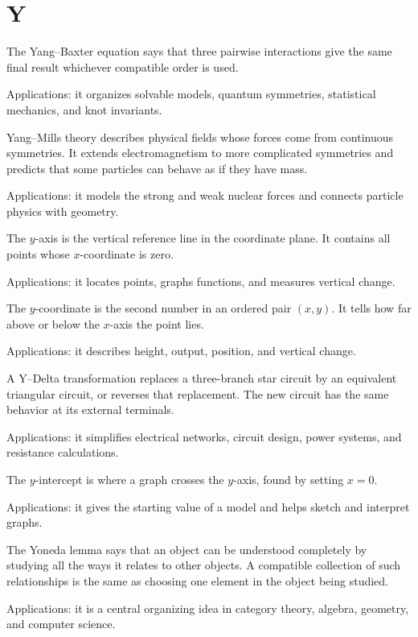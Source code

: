 \chapter*{Y}
\label{chap:y}

The Yang--Baxter equation says that three pairwise interactions give the same final result whichever compatible order is used. \par\noindent Applications: it organizes solvable models, quantum symmetries, statistical mechanics, and knot invariants.

Yang--Mills theory describes physical fields whose forces come from continuous symmetries. It extends electromagnetism to more complicated symmetries and predicts that some particles can behave as if they have mass. \par\noindent Applications: it models the strong and weak nuclear forces and connects particle physics with geometry.

The $y$-axis is the vertical reference line in the coordinate plane. It contains all points whose $x$-coordinate is zero. \par\noindent Applications: it locates points, graphs functions, and measures vertical change.

The $y$-coordinate is the second number in an ordered pair $(x,y)$. It tells how far above or below the $x$-axis the point lies. \par\noindent Applications: it describes height, output, position, and vertical change.

A Y--Delta transformation replaces a three-branch star circuit by an equivalent triangular circuit, or reverses that replacement. The new circuit has the same behavior at its external terminals. \par\noindent Applications: it simplifies electrical networks, circuit design, power systems, and resistance calculations.

The $y$-intercept is where a graph crosses the $y$-axis, found by setting $x=0$. \par\noindent Applications: it gives the starting value of a model and helps sketch and interpret graphs.

The Yoneda lemma says that an object can be understood completely by studying all the ways it relates to other objects. A compatible collection of such relationships is the same as choosing one element in the object being studied. \par\noindent Applications: it is a central organizing idea in category theory, algebra, geometry, and computer science.

